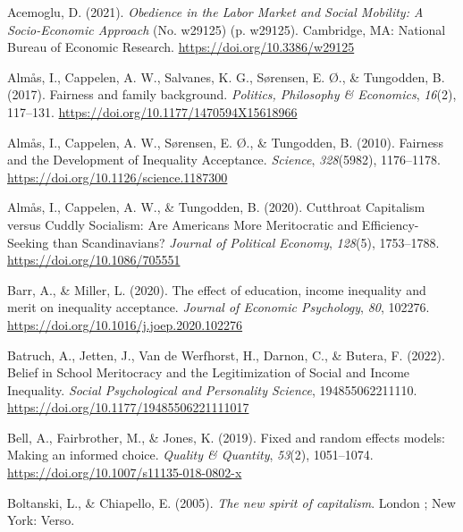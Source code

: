 \documentclass[
  letterpaper,
  DIV=11,
  numbers=noendperiod]{scrartcl}
\newlength{\cslhangindent}
\newlength{\cslentryspacingunit} %
\newenvironment{CSLReferences}[2] %
 {%
  \setlength{\parindent}{0pt}
  \ifodd #1
  \let\oldpar\par
  \def\par{\hangindent=\cslhangindent\oldpar}
  \fi
  \setlength{\parskip}{#2\cslentryspacingunit}
 }%
 {}
\begin{document}
\hypertarget{refs}{}
\begin{CSLReferences}{1}{0}
\leavevmode{}%
Acemoglu, D. (2021). \emph{Obedience in the {Labor Market} and {Social
Mobility}: {A Socio-Economic Approach}} (No. w29125) (p. w29125).
Cambridge, MA: National Bureau of Economic Research.
\url{https://doi.org/10.3386/w29125}

\leavevmode{}%
Almås, I., Cappelen, A. W., Salvanes, K. G., Sørensen, E. Ø., \&
Tungodden, B. (2017). Fairness and family background. \emph{Politics,
Philosophy \& Economics}, \emph{16}(2), 117--131.
\url{https://doi.org/10.1177/1470594X15618966}

\leavevmode{}%
Almås, I., Cappelen, A. W., Sørensen, E. Ø., \& Tungodden, B. (2010).
Fairness and the {Development} of {Inequality Acceptance}.
\emph{Science}, \emph{328}(5982), 1176--1178.
\url{https://doi.org/10.1126/science.1187300}

\leavevmode{}%
Almås, I., Cappelen, A. W., \& Tungodden, B. (2020). Cutthroat
{Capitalism} versus {Cuddly Socialism}: {Are Americans More
Meritocratic} and {Efficiency-Seeking} than {Scandinavians}?
\emph{Journal of Political Economy}, \emph{128}(5), 1753--1788.
\url{https://doi.org/10.1086/705551}

\leavevmode{}%
Barr, A., \& Miller, L. (2020). The effect of education, income
inequality and merit on inequality acceptance. \emph{Journal of Economic
Psychology}, \emph{80}, 102276.
\url{https://doi.org/10.1016/j.joep.2020.102276}

\leavevmode{}%
Batruch, A., Jetten, J., Van de Werfhorst, H., Darnon, C., \& Butera, F.
(2022). Belief in {School Meritocracy} and the {Legitimization} of
{Social} and {Income Inequality}. \emph{Social Psychological and
Personality Science}, 194855062211110.
\url{https://doi.org/10.1177/19485506221111017}

\leavevmode{}%
Bell, A., Fairbrother, M., \& Jones, K. (2019). Fixed and random effects
models: Making an informed choice. \emph{Quality \& Quantity},
\emph{53}(2), 1051--1074.
\url{https://doi.org/10.1007/s11135-018-0802-x}

\leavevmode{}%
Boltanski, L., \& Chiapello, E. (2005). \emph{The new spirit of
capitalism}. London ; New York: Verso.


\end{CSLReferences}
\end{document}
